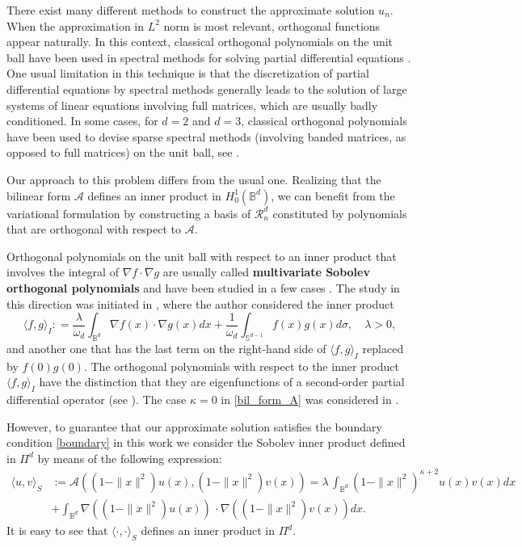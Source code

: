 \documentclass{amsart}
\theoremstyle{plain}%
\theoremstyle{definition}
\theoremstyle{remark}
\begin{document}
There exist many different methods to construct the approximate solution \(u_n\). When the approximation in $L^2$ norm is most relevant, orthogonal functions appear naturally. In this context, classical orthogonal polynomials on the unit ball have been used in spectral methods for solving partial differential equations \cite{ACH1, ACH2, ACH3, LX, STW}. One usual limitation in this technique is that the discretization of partial differential
equations by spectral methods generally leads to the solution of large systems of linear equations involving full matrices, which are usually badly conditioned. In some cases, for \(d=2\) and \(d=3\), classical orthogonal polynomials have been used to devise sparse spectral methods (involving banded matrices, as opposed to full matrices) on the unit ball, see \cite{vas15,vas18}. 

Our approach to this problem differs from the usual one. Realizing that
the bilinear form \(\mathcal{A}\) defines an inner product in \(H^1_0({\mathbb B}^d)\), we can benefit from the variational formulation by constructing a basis of \(\mathcal{R}_n^d\) constituted by polynomials that are orthogonal with respect to \(\mathcal{A}\). 

Orthogonal polynomials on the unit ball with respect to an inner product that involves the integral of $\nabla f \cdot \nabla g$ are usually called \textbf{multivariate Sobolev orthogonal polynomials} and have been studied in a few cases \cite{PPX, PX08, Xu08}. The study in this direction was 
initiated in \cite{Xu08}, where the author considered the inner product
\begin{equation} \label{eq:first-ip}
  \langle f,g \rangle_{I} : = {\frac{\lambda}{\omega_d}} \int_{{\mathbb B}^{d}} \nabla f(x) \cdot \nabla g(x) dx + {\frac{1}{\omega_d}} \int_{{\mathbb S}^{d-1}} f(x) g(x) d\sigma, \quad \lambda  >0, 
\end{equation}
and another one that has the last term on the right-hand side of $\langle f, g\rangle_I$ replaced by ${f(0)g(0)}$. The orthogonal polynomials with respect to the inner product $\langle f, g \rangle_I$ have the distinction that  they are eigenfunctions of a second-order partial differential operator (see \cite{PX08}). The case \(\kappa = 0\) in \eqref{bil_form_A} was considered in \cite{PPX}.

\bigskip

However, to guarantee that our approximate solution satisfies the boundary condition \eqref{boundary} in this work we consider the Sobolev inner product defined in \(\Pi^d\) by means of the following expression: 
\begin{align} 
\langle  u, v\rangle_{S} &:= \mathcal{A} \left((1-\|x\|^2) u(x), (1-\|x\|^2)v(x)\right) =  \lambda\, \int_{{\mathbb B}^{d}} (1-\|x\|^2)^{\kappa+2} u(x) v(x) dx \nonumber  \\ 
  &+ \int_{{\mathbb B}^{d}} \nabla ((1-\|x\|^2)u(x))\,\cdot \nabla ((1-\|x\|^2)v(x)) dx. \label{Sob_ip}
\end{align}
It is easy to see that \(\langle  \cdot, \cdot\rangle_{S}\) defines an inner product in \(\Pi^d\). 
\end{document}
